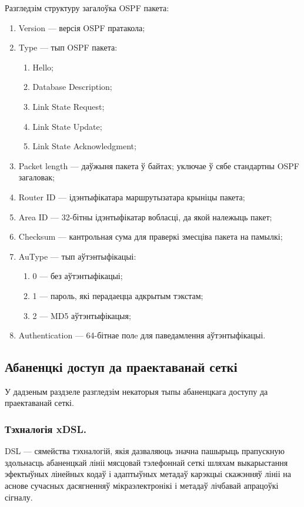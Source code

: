 Разгледзім структуру загалоўка OSPF пакета:
\begin{enumerate}
    \item Version --- версія OSPF пратакола;
    \item Type --- тып OSPF пакета:
    \begin{enumerate}
        \item Hello;
        \item Database Description;
        \item Link State Request;
        \item Link State Update;
        \item Link State Acknowledgment;
    \end{enumerate}
    \item Packet length --- даўжыня пакета ў байтах;
          уключае ў сябе стандартны OSPF загаловак;
    \item Router ID --- ідэнтыфікатара маршрутызатара крыніцы пакета;
    \item Area ID --- 32-бітны ідэнтыфікатар вобласці, да якой належыць пакет;
    \item Checksum --- кантрольная сума для праверкі змесціва пакета на памылкі;
    \item AuType --- тып аўтэнтыфікацыі:
    \begin{enumerate}
        \item 0 --- без аўтэнтыфікацыі;
        \item 1 --- пароль, які перадаецца адкрытым тэкстам;
        \item 2 --- MD5 аўтэнтыфікацыя;
    \end{enumerate}
    \item Authentication --- 64-бітнае полe для паведамлення аўтэнтыфікацыі.
\end{enumerate}

\subsection{Абаненцкі доступ да праектаванай сеткі}

У дадзеным раздзеле разгледзім некаторыя тыпы абаненцкага доступу
да праектаванай сеткі.

\subsubsection{Тэхналогія xDSL.}

DSL --- сямейства тэхналогій, якія дазваляюць значна пашырыць прапускную здольнасць абаненцкай лініі мясцовай тэлефоннай сеткі шляхам выкарыстання эфектыўных лінейных кодаў і адаптыўных метадаў карэкцыі скажэнняў лініі на аснове сучасных дасягненняў мікраэлектронікі і метадаў лічбавай апрацоўкі сігналу.

